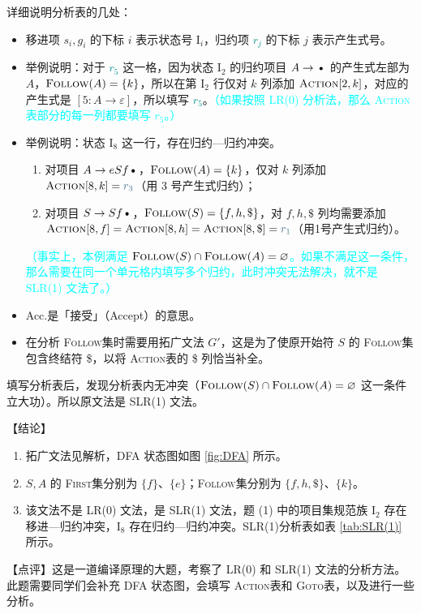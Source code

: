 \documentclass[UTF8]{ctexart}
\newcommand\FIRST{\textsc{First}}
\newcommand\FOLLOW{\textsc{Follow}}
\newcommand\ACTION{\textsc{Action}}
\newcommand\GOTO{\textsc{Goto}}
\newcommand\D{\text{\textbullet}}
\begin{document}
详细说明分析表的几处：
\begin{itemize}
\renewcommand\theenumi{\roman{enumi}} %
  \item 移进项 $s_i,g_i$ 的下标 $i$ 表示状态号 $\mathrm{I}_i$，归约项 \textcolor{darkcyan}{$r_j$} 的下标 $j$ 表示产生式号。
  \item 举例说明：对于 \textcolor{darkcyan}{$r_5$} 这一格，因为状态 $\mathrm{I_2}$ 的归约项目 $A\to\D$ 的产生式左部为 $A$，$\FOLLOW(A)=\{k\}$，所以在第 $\mathrm{I_2}$ 行仅对 $k$ 列添加 $\ACTION[2,k]$，对应的产生式是 $[5:A\to\varepsilon]$，所以填写 \textcolor{darkcyan}{$r_5$}。\textcolor{cyan}{（如果按照 LR(0) 分析法，那么 \ACTION 表部分的每一列都要填写 $r_5$。）}
  \item 举例说明：状态 $\mathrm{I_8}$ 这一行，存在归约—归约冲突。

  \begin{enumerate}[label=\theenumi)]
    \item 对项目 $A\to eSf\D$，$\FOLLOW(A)=\{k\}$，仅对 $k$ 列添加 $\ACTION[8,k]=\textcolor{darkcyan}{r_3}$（用 3 号产生式归约）；
    \item 对项目 $S\to Sf\D$，$\FOLLOW(S)=\{f,h,\$ \}$，对 $f,h,\$ $ 列均需要添加 $\ACTION[8,f]=\ACTION[8,h]=\ACTION[8,\$]=\textcolor{darkcyan}{r_1}$（用1号产生式归约）。
  \end{enumerate}

  \textcolor{cyan}{（事实上，本例满足 $\FOLLOW(S)\cap \FOLLOW(A) = \varnothing$。如果不满足这一条件，那么需要在同一个单元格内填写多个归约，此时冲突无法解决，就不是 SLR(1) 文法了。）}
  \item Acc.是「接受」（Accept）的意思。
  
  \item 在分析 \FOLLOW 集时需要用拓广文法 $G'$，这是为了使原开始符 $S$ 的 \FOLLOW 集包含终结符 \$，以将 \ACTION 表的 \$ 列恰当补全。
\end{itemize}

填写分析表后，发现分析表内无冲突（$\FOLLOW(S)\cap \FOLLOW(A) = \varnothing$ 这一条件立大功）。所以原文法是 SLR(1) 文法。


\vspace{1em}

{\color{cyan!80!black}
【结论】
\begin{enumerate}[itemsep=0pt,parsep=0pt,label=(\theenumi)]
    \item 拓广文法见解析，DFA 状态图如图 \ref{fig:DFA} 所示。
    \item $S,A$ 的 \FIRST 集分别为 $\{f\}$、$\{e\}$；\FOLLOW 集分别为 $\{f,h,\$ \}$、$\{k\}$。
    \item 该文法不是 LR(0) 文法，是 SLR(1) 文法，题 (1) 中的项目集规范族 $\mathrm{I_2}$ 存在移进—归约冲突，$\mathrm{I_8}$ 存在归约—归约冲突。SLR(1)分析表如表 \ref{tab:SLR(1)} 所示。
\end{enumerate}

【点评】这是一道编译原理的大题，考察了 LR(0) 和 SLR(1) 文法的分析方法。此题需要同学们会补充 DFA 状态图，会填写 \ACTION 表和 \GOTO 表，以及进行一些分析。
}
\end{document}
